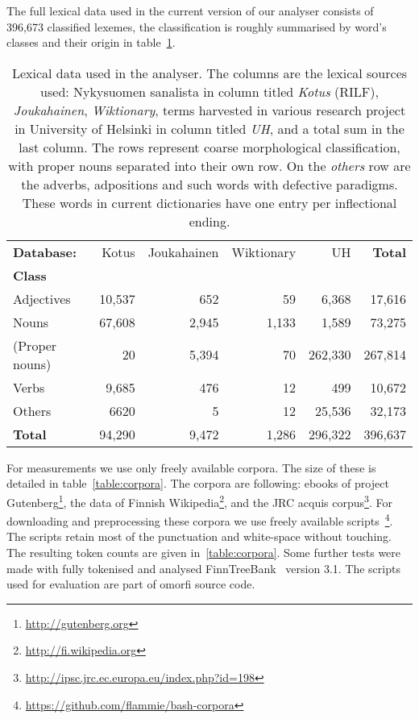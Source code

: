 \documentclass[a4paper,12pt]{article}
\begin{document}
The full lexical data used in the current version of our analyser consists of
396,673 classified lexemes, the classification is roughly summarised by word's
classes and their origin in table~\ref{table:lexical}. 

\begin{table}
    \begin{scriptsize}
  \centering
    \begin{tabular}{|l|r|r|r|r||r|}
        \hline
        \bf Database: & Kotus & Joukahainen & Wiktionary & UH & \bf Total \\
        \bf Class   & & & & & \\
        \hline
        Adjectives     & 10,537 & 652   & 59    & 6,368   & 17,616  \\
        Nouns          & 67,608 & 2,945 & 1,133 & 1,589   & 73,275  \\
        (Proper nouns) & 20     & 5,394 & 70    & 262,330 & 267,814 \\
        Verbs          & 9,685  & 476   & 12    & 499     & 10,672  \\
        Others         & 6620   & 5     & 12    & 25,536  & 32,173  \\
        \hline
        \bf Total      & 94,290 & 9,472 & 1,286 & 296,322 & 396,637 \\
        \hline
    \end{tabular}
  \caption{Lexical data used in the analyser.  The columns are the lexical
      sources used: Nykysuomen sanalista in column titled \emph{Kotus} (RILF),
      \emph{Joukahainen}, \emph{Wiktionary}, terms harvested in various
      research project in University of Helsinki in column titled \emph{UH},
      and a total sum in the last column. The rows represent coarse
      morphological classification, with proper nouns separated into their own
      row. On the \emph{others} row are the adverbs, adpositions and such words
      with defective paradigms. These words in current dictionaries have one
      entry per inflectional ending.
  \label{table:lexical}}
  \end{scriptsize}
\end{table}

For measurements we use only freely available corpora. The size of these is
detailed in table~\ref{table:corpora}. The corpora are following: ebooks of project
Gutenberg\footnote{\url{http://gutenberg.org}}, the data of Finnish
Wikipedia\footnote{\url{http://fi.wikipedia.org}}, and the JRC acquis
corpus\footnote{\url{http://ipsc.jrc.ec.europa.eu/index.php?id=198}}. For
downloading and preprocessing these corpora we use freely available
scripts~\footnote{\url{https://github.com/flammie/bash-corpora}}. The scripts
retain most of the punctuation and white-space without touching. The resulting
token counts are given in~\ref{table:corpora}. Some further tests were made
with fully tokenised and analysed
FinnTreeBank~\citep{voutilainen2012specifying} version 3.1.  The scripts used
for evaluation are part of omorfi source code.
\end{document}
